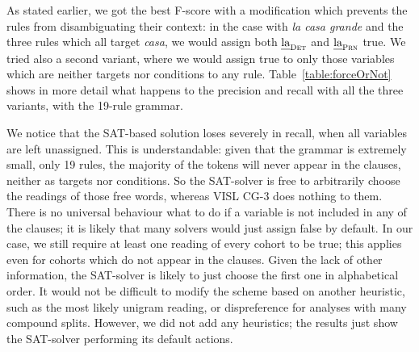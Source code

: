 As stated earlier, we got the best F-score with a modification which prevents the rules 
from disambiguating their context: in the case with {\em la casa grande} and the 
three rules which all target {\em casa}, we would assign both $\text{\em la}_{\text{\sc Det}}${} and $\text{\em la}_{\text{\sc Prn}}${} true.
We tried also a second variant, where we would assign true to only those variables which are 
neither targets nor conditions to any rule.
Table~\ref{table:forceOrNot} shows in more detail what happens to the precision and recall with all the three variants, with the 19-rule grammar.



We notice that the SAT-based solution loses severely in recall, 
when all variables are left unassigned. This is understandable: given that
the grammar is extremely small, only 19 rules, the majority of the tokens will 
never appear in the clauses, neither as targets nor conditions. So the SAT-solver is free to 
arbitrarily choose the readings of those free words, whereas VISL CG-3 does nothing to them. 
There is no universal behaviour what to do if a variable is not included in any of the clauses; it is likely that many solvers would just assign false by default. In our case, we still require at least one reading of every cohort to be true; this applies even for cohorts which do not appear in the clauses. 
Given the lack of other information, the SAT-solver is likely to just choose the first one in alphabetical order. It would not be difficult to modify the scheme based on another heuristic, such as the most likely unigram reading, or dispreference for analyses with many compound splits. However, we did not add any heuristics; the results just show the SAT-solver performing its default actions.


\def\noAss{{\sc NoAss}}
\def\noAff{{\sc NoAff}}
\def\noTar{{\sc NoTar}}


